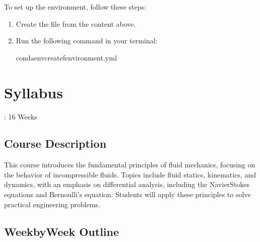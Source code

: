 \documentclass[letterpaper,10pt,english]{jupyterBook}
\begin{document}
\sphinxAtStartPar
To set up the environment, follow these steps:
\begin{enumerate}
%
\item {} 
\sphinxAtStartPar
Create the  file from the content above.

\item {} 
\sphinxAtStartPar
Run the following command in your terminal:

\begin{sphinxVerbatim}[commandchars=\\\{\}]
condaenvcreate\PYGZhy{}fenvironment.yml
\end{sphinxVerbatim}

\end{enumerate}

\sphinxstepscope


\chapter{Syllabus}
\label{\detokenize{syllabus:syllabus}}\label{\detokenize{syllabus::doc}}
\sphinxAtStartPar
{}: 16 Weeks


\section{Course Description}
\label{\detokenize{syllabus:course-description}}
\sphinxAtStartPar
This course introduces the fundamental principles of fluid mechanics, focusing on the behavior of incompressible fluids. Topics include fluid statics, kinematics, and dynamics, with an emphasis on differential analysis, including the Navier\sphinxhyphen{}Stokes equations and Bernoulli’s equation. Students will apply these principles to solve practical engineering problems.


\section{Week\sphinxhyphen{}by\sphinxhyphen{}Week Outline}
\label{\detokenize{syllabus:week-by-week-outline}}
\end{document}
